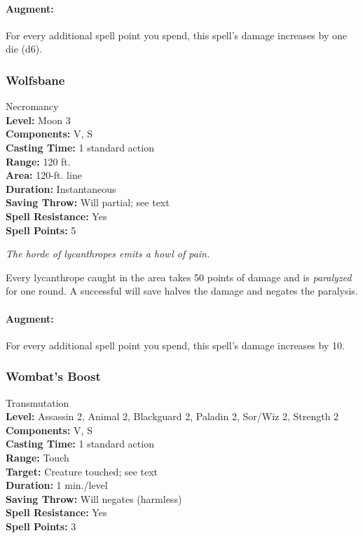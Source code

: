 \paragraph{Augment:} For every additional spell point you spend, this spell's damage increases by one die (d6).

\subsubsection{Wolfsbane}
\label{Spell:Wolfsbane}
Necromancy
\\ \textbf{Level:} Moon 3
\\ \textbf{Components:} V, S
\\ \textbf{Casting Time:} 1 standard action
\\ \textbf{Range:} 120 ft.
\\ \textbf{Area:} 120-ft. line
\\ \textbf{Duration:} Instantaneous
\\ \textbf{Saving Throw:} Will partial; see text
\\ \textbf{Spell Resistance:} Yes
\\ \textbf{Spell Points:} 5

\emph{The horde of lycanthropes emits a howl of pain.}

Every lycanthrope caught in the area takes 50 points of damage and is \emph{paralyzed} for one round. A successful will save halves the damage and negates the paralysis.

\paragraph{Augment:} For every additional spell point you spend, this spell's damage increases by 10.
\subsubsection{Wombat's Boost}
\label{Spell:WombatsBoost}
Transmutation
\\ \textbf{Level:} Assassin 2, Animal 2, Blackguard 2, Paladin 2, Sor/Wiz 2, Strength 2
\\ \textbf{Components:} V, S
\\ \textbf{Casting Time:} 1 standard action
\\ \textbf{Range:} Touch
\\ \textbf{Target:} Creature touched; see text
\\ \textbf{Duration:} 1 min./level
\\ \textbf{Saving Throw:} Will negates (harmless)
\\ \textbf{Spell Resistance:} Yes
\\ \textbf{Spell Points:} 3

